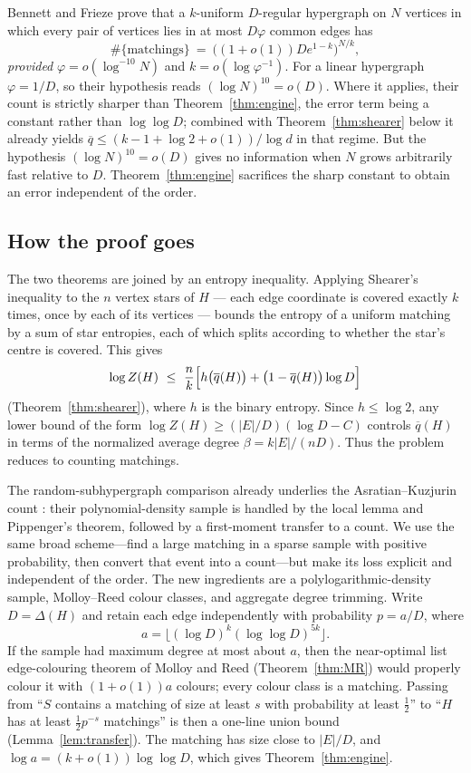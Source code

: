 \documentclass[11pt,a4paper]{amsart}
\theoremstyle{plain}
\theoremstyle{definition}
\theoremstyle{remark}
\newcommand{\EE}{E}
\newcommand{\qbar}{\overline{q}}
\newcommand{\Deltaop}{\Delta}
\begin{document}
Bennett and Frieze \cite[Theorem 4(b)]{BennettFrieze} prove that a $k$-uniform
$D$-regular hypergraph on $N$
vertices in which every pair of vertices lies in at most $D\varphi$ common edges has
\[
  \#\{\text{matchings}\}\ =\ \bigl((1+o(1))D e^{1-k}\bigr)^{N/k},
\]
\emph{provided} $\varphi=o(\log^{-10}N)$ and $k=o(\log \varphi^{-1})$. For a linear
hypergraph $\varphi=1/D$, so their hypothesis reads $(\log N)^{10}=o(D)$. Where it applies,
their count is strictly sharper than Theorem~\ref{thm:engine}, the error term being a
constant rather than $\log\log D$; combined with Theorem~\ref{thm:shearer} below it already
yields $\qbar\le(k-1+\log2+o(1))/\log d$ in that regime. But the hypothesis
$(\log N)^{10}=o(D)$ gives no information when $N$ grows arbitrarily fast relative to
$D$. Theorem~\ref{thm:engine} sacrifices the sharp constant to obtain an error independent
of the order.

\subsection{How the proof goes}
\label{subsec:overview}

The two theorems are joined by an entropy inequality. Applying Shearer's inequality to the
$n$ vertex stars of $H$ --- each edge coordinate is covered exactly $k$ times, once by each
of its vertices --- bounds the entropy of a uniform matching by a sum of star entropies,
each of which splits according to whether the star's centre is covered. This gives
\[
  \log Z(H)\ \le\ \frac nk\Bigl[h\bigl(\qbar(H)\bigr)
    +\bigl(1-\qbar(H)\bigr)\log D\Bigr]
\]
(Theorem~\ref{thm:shearer}), where $h$ is the binary entropy. Since $h\le\log2$, any lower
bound of the form $\log Z(H)\ge(|\EE|/D)(\log D-C)$ controls $\qbar(H)$ in terms of the
normalized average degree $\beta=k|\EE|/(nD)$. Thus the problem reduces to counting
matchings.

The random-subhypergraph comparison already underlies the Asratian--Kuzjurin count
\cite{AsratianKuzjurin}: their polynomial-density sample is handled by the local lemma
and Pippenger's theorem, followed by a first-moment transfer to a count. We use the same
broad scheme---find a large matching in a sparse sample with positive probability, then
convert that event into a count---but make its loss explicit and independent of the
order. The new ingredients are a polylogarithmic-density sample, Molloy--Reed colour
classes, and aggregate degree trimming. Write $D=\Deltaop(H)$ and retain each edge
independently with probability
$p=a/D$, where
\[
  a=\bigl\lfloor(\log D)^k(\log\log D)^{5k}\bigr\rfloor.
\]
If the sample had maximum degree at most about $a$,
then the near-optimal list edge-colouring theorem of Molloy and Reed
(Theorem~\ref{thm:MR}) would properly colour it with $(1+o(1))a$ colours; every colour
class is a matching. Passing from ``$S$ contains a matching of size at least $s$
with probability at least $\tfrac12$'' to ``$H$ has at least $\tfrac12 p^{-s}$ matchings''
is then a one-line union bound (Lemma~\ref{lem:transfer}). The matching has size close to
$|\EE|/D$, and $\log a=(k+o(1))\log\log D$, which gives Theorem~\ref{thm:engine}.
\end{document}
